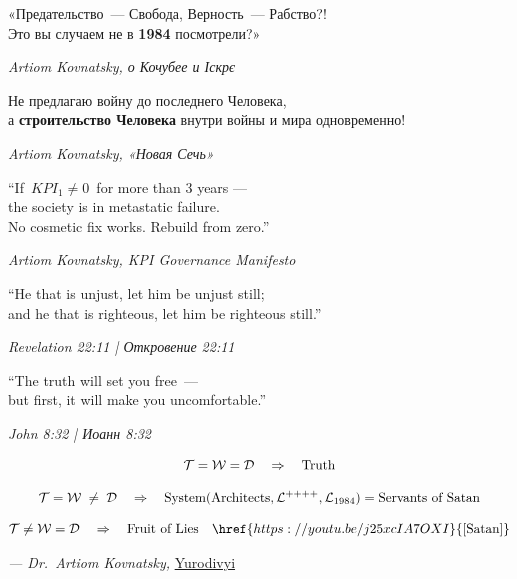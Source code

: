 \documentclass[11pt,a4paper]{article}
\theoremstyle{definition}
\theoremstyle{remark}
\newcommand{\LondonOp}{\mathcal{L}^{++++}}  %
\newcommand{\Thought}{\mathcal{T}}
\newcommand{\Word}{\mathcal{W}}
\newcommand{\Deed}{\mathcal{D}}
\begin{document}
\epigraph{
  \foreignlanguage{russian}{«Предательство~--- Свобода,
  Верность~--- Рабство?!\\
  Это вы случаем не в \textbf{1984} посмотрели?»}
}{\textit{Artiom Kovnatsky, \foreignlanguage{russian}{о Кочубее и Іскрє}}}

\epigraph{
  \foreignlanguage{russian}{Не предлагаю войну до последнего Человека,\\
  а \textbf{строительство Человека} внутри войны и мира одновременно!}
}{\textit{Artiom Kovnatsky, \foreignlanguage{russian}{«Новая Сечь»}}}

\epigraph{
  ``If \,$KPI_1 \neq 0$\, for more than 3 years ---\\
  the society is in metastatic failure.\\
  No cosmetic fix works. Rebuild from zero.''
}{\textit{Artiom Kovnatsky, KPI Governance Manifesto}}

\epigraph{
  ``He that is unjust, let him be unjust still;\\
  and he that is righteous, let him be righteous still.''
}{\textit{Revelation 22:11 \;|\; \foreignlanguage{russian}{Откровение 22:11}}}

\epigraph{
  ``The truth will set you free~---\\
  but first, it will make you uncomfortable.''
}{\textit{John 8:32 \;|\; \foreignlanguage{russian}{Иоанн 8:32}}}

\vspace{0.5cm}

\begin{center}
{\color{accentcolor}
\begin{gather*}
  \Thought = \Word = \Deed \quad \Rightarrow \quad \text{Truth} \\[0.3cm]
  \Thought = \Word \;\neq\; \Deed \quad \Rightarrow \quad
  \text{System}(\text{Architects}, \LondonOp, \mathcal{L}_{1984})
  = \text{Servants of Satan}\\[0.3cm]
  \Thought \neq \Word = \Deed \quad \Rightarrow \quad
  \text{Fruit of Lies} \quad
  \href{https://youtu.be/j25xcIA7OXI}{\text{[Satan]}}
\end{gather*}
}
\end{center}

\vspace{0.3cm}
\begin{center}
  \textit{--- Dr.\ Artiom Kovnatsky,}
  \href{https://en.wikipedia.org/wiki/Foolishness_for_Christ}{Yurodivyi}
\end{center}
\end{document}
